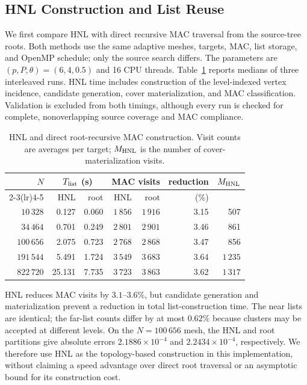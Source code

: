 \subsection{HNL Construction and List Reuse}
\label{sec:hnl_measured_cost}

We first compare HNL with direct recursive MAC traversal from the source-tree
roots. Both methods use the same adaptive meshes, targets, MAC, list storage,
and OpenMP schedule; only the source search differs. The parameters are
$(p,P,\theta)=(6,4,0.5)$ and 16 CPU threads. Table~\ref{tab:hnl_ablation}
reports medians of three interleaved runs. HNL time includes construction of
the level-indexed vertex incidence, candidate generation, cover
materialization, and MAC classification. Validation is excluded from both
timings, although every run is checked for complete, nonoverlapping source
coverage and MAC compliance.

\begin{table}[!htbp]
\centering
\caption{HNL and direct root-recursive MAC construction. Visit counts are
averages per target; $M_{\rm HNL}$ is the number of cover-materialization
visits.}
\label{tab:hnl_ablation}
\small
\setlength{\tabcolsep}{4.2pt}
\begin{tabular}{rrrrrrr}
\toprule
$N$ & \multicolumn{2}{c}{$T_{\rm list}$ (s)} &
\multicolumn{2}{c}{MAC visits} & reduction & $M_{\rm HNL}$\\
\cmidrule(lr){2-3}\cmidrule(lr){4-5}
& HNL & root & HNL & root & (\%) &\\
\midrule
$10\,328$  & 0.127 & 0.060 & $1\,856$ & $1\,916$ & 3.15 & 507\\
$34\,464$  & 0.701 & 0.249 & $2\,801$ & $2\,901$ & 3.46 & 861\\
$100\,656$ & 2.075 & 0.723 & $2\,768$ & $2\,868$ & 3.47 & 856\\
$191\,544$ & 5.491 & 1.724 & $3\,549$ & $3\,683$ & 3.64 & $1\,235$\\
$822\,720$ & 25.131 & 7.735 & $3\,723$ & $3\,863$ & 3.62 & $1\,317$\\
\bottomrule
\end{tabular}
\end{table}

HNL reduces MAC visits by $3.1$--$3.6\%$, but candidate generation and
materialization prevent a reduction in total list-construction time. The near
lists are identical; the far-list counts differ by at most $0.62\%$ because
clusters may be accepted at different levels. On the $N=100\,656$ mesh, the
HNL and root partitions give absolute errors $2.1886\times10^{-4}$ and
$2.2434\times10^{-4}$, respectively. We therefore use HNL as the
topology-based construction in this implementation, without claiming a speed
advantage over direct root traversal or an asymptotic bound for its
construction cost.

